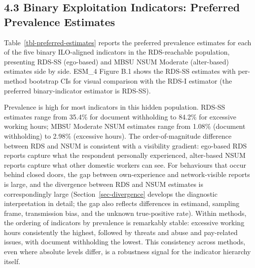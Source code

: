 \documentclass[
  12pt,
  letterpaper,
  DIV=11,
  numbers=noendperiod]{scrartcl}
\begin{document}
\subsection{4.3 Binary Exploitation Indicators: Preferred Prevalence
Estimates}\label{sec-binary-results}

Table~\ref{tbl-preferred-estimates} reports the preferred prevalence
estimates for each of the five binary ILO-aligned indicators in the
RDS-reachable population, presenting RDS-SS (ego-based) and MBSU NSUM
Moderate (alter-based) estimates side by side. ESM\_4 Figure B.1 shows
the RDS-SS estimates with per-method bootstrap CIs for visual comparison
with the RDS-I estimator (the preferred binary-indicator estimator is
RDS-SS).

Prevalence is high for most indicators in this hidden population. RDS-SS
estimates range from 35.4\% for document withholding to 84.2\% for
excessive working hours; MBSU Moderate NSUM estimates range from 1.08\%
(document withholding) to 2.98\% (excessive hours). The
order-of-magnitude difference between RDS and NSUM is consistent with a
visibility gradient: ego-based RDS reports capture what the respondent
personally experienced, alter-based NSUM reports capture what other
domestic workers can see. For behaviours that occur behind closed doors,
the gap between own-experience and network-visible reports is large, and
the divergence between RDS and NSUM estimates is correspondingly large
(Section~\ref{sec-divergence} develops the diagnostic interpretation in
detail; the gap also reflects differences in estimand, sampling frame,
transmission bias, and the unknown true-positive rate). Within methods,
the ordering of indicators by prevalence is remarkably stable: excessive
working hours consistently the highest, followed by threats and abuse
and pay-related issues, with document withholding the lowest. This
consistency across methods, even where absolute levels differ, is a
robustness signal for the indicator hierarchy itself.
\end{document}
